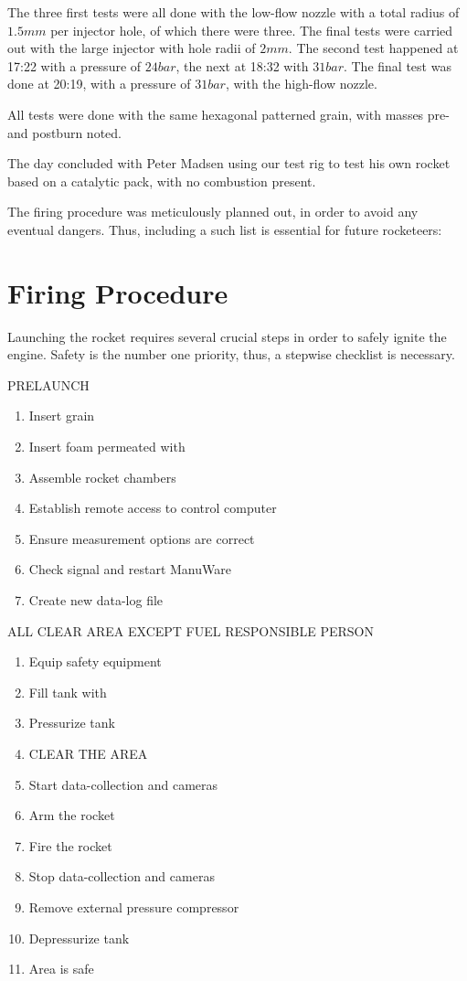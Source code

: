 		The three first tests were all done with the low-flow nozzle with a total radius of $\si{1.5}{mm}$ per injector hole, of which there were three. The final tests were carried out with the large injector with hole radii of $\si{2}{mm}$. The second test happened at 17:22 with a  pressure of $\si{24}{bar}$, the next at 18:32 with $\si{31}{bar}$. The final test was done at 20:19, with a  pressure of $\si{31}{bar}$, with the high-flow nozzle.

		All tests were done with the same hexagonal patterned grain, with masses pre- and postburn noted.

		The day concluded with Peter Madsen using our test rig to test his own rocket based on a catalytic pack, with no combustion present.

		The firing procedure was meticulously planned out, in order to avoid any eventual dangers. Thus, including a such list is essential for future rocketeers:

\section{Firing Procedure}
Launching the rocket requires several crucial steps in order to safely ignite the engine. Safety is the number one priority, thus, a stepwise checklist is necessary.

PRELAUNCH
\begin{enumerate}
  \itemsep0em
  \item Insert grain
  \item Insert foam permeated with 
  \item Assemble rocket chambers
  \item Establish remote access to control computer
  \item Ensure measurement options are correct
  \item Check signal and restart ManuWare
  \item Create new data-log file
\end{enumerate}
ALL CLEAR AREA EXCEPT FUEL RESPONSIBLE PERSON
\begin{enumerate}
  \itemsep0em
  \item Equip  safety equipment
  \item Fill tank with 
  \item Pressurize tank
  \item CLEAR THE AREA
  \item Start data-collection and cameras
  \item Arm the rocket
  \item Fire the rocket
  \item Stop data-collection and cameras
  \item Remove external pressure compressor
  \item Depressurize tank
  \item Area is safe
\end{enumerate}

